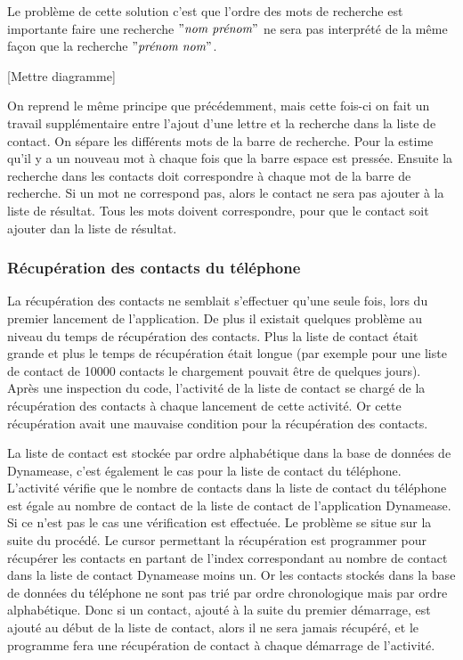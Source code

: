 Le problème de cette solution c'est que l'ordre des mots de recherche est importante faire une recherche $"\textit{nom prénom}"$ ne sera pas interprété de la même façon que la recherche $"\textit{prénom nom}"$.

[Mettre diagramme]

On reprend le même principe que précédemment, mais cette fois-ci on fait un travail supplémentaire entre l'ajout d'une lettre et la recherche dans la liste de contact. On sépare les différents mots de la barre de recherche. Pour la estime qu'il y a un nouveau mot à chaque fois que la barre espace est pressée. Ensuite la recherche dans les contacts doit correspondre à chaque mot de la barre de recherche. Si un mot ne correspond pas, alors le contact ne sera pas ajouter à la liste de résultat. Tous les mots doivent correspondre, pour que le contact soit ajouter dan la liste de résultat.

\subsubsection{Récupération des contacts du téléphone}

La récupération des contacts ne semblait s'effectuer qu'une seule fois, lors du premier lancement de l'application. De plus il existait quelques problème au niveau du temps de récupération des contacts. Plus la liste de contact était grande et plus le temps de récupération était longue (par exemple pour une liste de contact de 10000 contacts le chargement pouvait être de quelques jours).\\

Après une inspection du code, l'activité de la liste de contact se chargé de la récupération des contacts à chaque lancement de cette activité. Or cette récupération avait une mauvaise condition pour la récupération des contacts.

La liste de contact est stockée par ordre alphabétique dans la base de données de Dynamease, c'est également le cas pour la liste de contact du téléphone. L'activité vérifie que le nombre de contacts dans la liste de contact du téléphone est égale au nombre de contact de la liste de contact de l'application Dynamease. Si ce n'est pas le cas une vérification est effectuée. Le problème se situe sur la suite du procédé. Le cursor permettant la récupération est programmer pour récupérer les contacts en partant de l'index correspondant au nombre de contact dans la liste de contact Dynamease moins un. Or les contacts stockés dans la base de données du téléphone ne sont pas trié par ordre chronologique mais par ordre alphabétique. Donc si un contact, ajouté à la suite du premier démarrage, est ajouté au début de la liste de contact, alors il ne sera jamais récupéré, et le programme fera une récupération de contact à chaque démarrage de l'activité.

